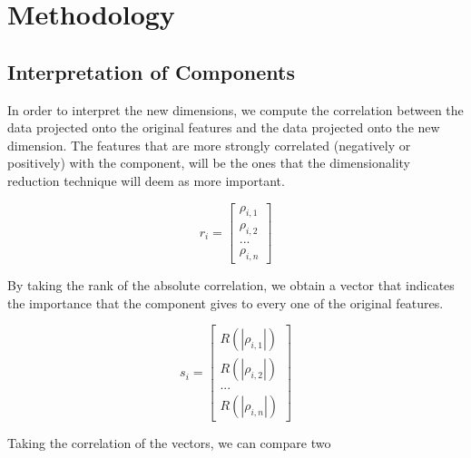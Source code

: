 \chapter{Methodology}

\section{Interpretation of Components}
In order to interpret the new dimensions, we compute the correlation between the data projected onto the original features and the data projected onto the new dimension. The features that are more strongly correlated (negatively or positively) with the component, will be the ones that the dimensionality reduction technique will deem as more important.

$$
r_i =
\begin{bmatrix}
    \rho_{i,1} \\
    \rho_{i,2} \\
    ... \\
    \rho_{i,n}
\end{bmatrix}
$$

By taking the rank of the absolute correlation, we obtain a vector that indicates the importance that the component gives to every one of the original features.

$$
s_i =
\begin{bmatrix}
    R(|\rho_{i,1}|) \\
    R(|\rho_{i,2}|) \\
    ... \\
    R(|\rho_{i,n}|)
\end{bmatrix}
$$

Taking the correlation of the vectors, we can compare two


